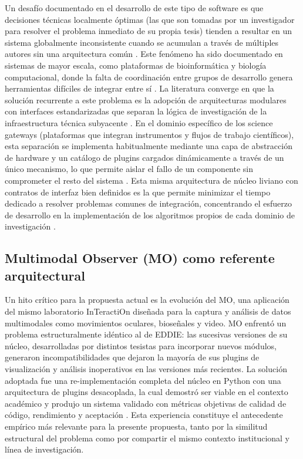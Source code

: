 Un desafío documentado en el desarrollo de este tipo de software es que decisiones técnicas localmente óptimas (las que son tomadas por un investigador para resolver el problema inmediato de su propia tesis) tienden a resultar en un sistema globalmente inconsistente cuando se acumulan a través de múltiples autores sin una arquitectura común \citep{ernst2026nature}. Este fenómeno ha sido documentado en sistemas de mayor escala, como plataformas de bioinformática y biología computacional, donde la falta de coordinación entre grupos de desarrollo genera herramientas difíciles de integrar entre sí \citep{orozco2017diseno}. La literatura converge en que la solución recurrente a este problema es la adopción de arquitecturas modulares con interfaces estandarizadas que separan la lógica de investigación de la infraestructura técnica subyacente \citep{bustio2013arquitectura,glatard2017software}. En el dominio específico de los science gateways (plataformas que integran instrumentos y flujos de trabajo científicos), esta separación se implementa habitualmente mediante una capa de abstracción de hardware y un catálogo de plugins cargados dinámicamente a través de un único mecanismo, lo que permite aislar el fallo de un componente sin comprometer el resto del sistema \citep{glatard2017software}. Esta misma arquitectura de núcleo liviano con contratos de interfaz bien definidos es la que permite minimizar el tiempo dedicado a resolver problemas comunes de integración, concentrando el esfuerzo de desarrollo en la implementación de los algoritmos propios de cada dominio de investigación \citep{bustio2013arquitectura}.

\subsection{Multimodal Observer (MO) como referente arquitectural}
Un hito crítico para la propuesta actual es la evolución del MO, una aplicación del mismo laboratorio InTeractiOn diseñada para la captura y análisis de datos multimodales como movimientos oculares, bioseñales y video. MO enfrentó un problema estructuralmente idéntico al de EDDIE: las sucesivas versiones de su núcleo, desarrolladas por distintos tesistas para incorporar nuevos módulos, generaron incompatibilidades que dejaron la mayoría de sus plugins de visualización y análisis inoperativos en las versiones más recientes. La solución adoptada fue una re-implementación completa del núcleo en Python con una arquitectura de plugins desacoplada, la cual demostró ser viable en el contexto académico y produjo un sistema validado con métricas objetivas de calidad de código, rendimiento y aceptación \citep{figueroa2025arquitectura}. Esta experiencia constituye el antecedente empírico más relevante para la presente propuesta, tanto por la similitud estructural del problema como por compartir el mismo contexto institucional y línea de investigación.

